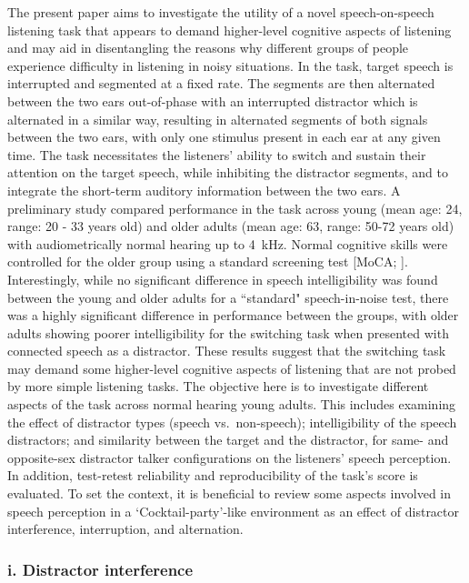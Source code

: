 \documentclass[a4paper, twoside]{templates/ociamthesis}
\begin{document}
The present paper aims to investigate the utility of a novel speech-on-speech listening task that appears to demand higher-level cognitive aspects of listening and may aid in disentangling the reasons why different groups of people experience difficulty in listening in noisy situations. In the task, target speech is interrupted and segmented at a fixed rate. The segments are then alternated between the two ears out-of-phase with an interrupted distractor which is alternated in a similar way, resulting in alternated segments of both signals between the two ears, with only one stimulus present in each ear at any given time. The task necessitates the listeners' ability to switch and sustain their attention on the target speech, while inhibiting the distractor segments, and to integrate the short-term auditory information between the two ears.
A preliminary study \autocite[unpublished BSc thesis][]{Akinseye2015} compared performance in the task across young (mean age: 24, range: 20 - 33 years old) and older adults (mean age: 63, range: 50-72 years old) with audiometrically normal hearing up to 4~kHz. Normal cognitive skills were controlled for the older group using a standard screening test {[}MoCA; \textcite{Nasreddine2005}{]}. Interestingly, while no significant difference in speech intelligibility was found between the young and older adults for a ``standard" speech-in-noise test, there was a highly significant difference in performance between the groups, with older adults showing poorer intelligibility for the switching task when presented with connected speech as a distractor. These results suggest that the switching task may demand some higher-level cognitive aspects of listening that are not probed by more simple listening tasks.
The objective here is to investigate different aspects of the task across normal hearing young adults. This includes examining the effect of distractor types (speech vs.~non-speech); intelligibility of the speech distractors; and similarity between the target and the distractor, for same- and opposite-sex distractor talker configurations on the listeners' speech perception. In addition, test-retest reliability and reproducibility of the task's score is evaluated.
To set the context, it is beneficial to review some aspects involved in speech perception in a `Cocktail-party'-like environment \autocite{Cherry1953} as an effect of distractor interference, interruption, and alternation.\\

\hypertarget{i.-distractor-interference}{%
\subsubsection*{i. Distractor interference}\label{i.-distractor-interference}}
\end{document}
